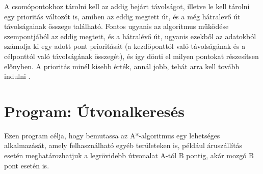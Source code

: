 A csomópontokhoz tárolni kell az addig bejárt távolságot, illetve le kell tárolni egy prioritás változót is, amiben az eddig megtett út, és a még hátralevő út távolságainak összege található. Fontos ugyanis az algoritmus működése szempontjából az eddig megtett, és a hátralévő út, ugyanis ezekből az adatokból számolja ki egy adott pont prioritását (a kezdőponttól való távolságának és a célponttól való távolságának összegét), és így dönti el milyen pontokat részesítsen előnyben. A prioritás minél kisebb érték, annál jobb, tehát arra kell tovább indulni \cite{Astar3}.


\section{Program: Útvonalkeresés}

Ezen program célja, hogy bemutassa az A*-algoritmus egy lehetséges alkalmazását, amely felhasználható egyéb területeken is, például áruszállítás esetén meghatározhatjuk a legrövidebb útvonalat A-tól B pontig, akár mozgó B pont esetén is.

